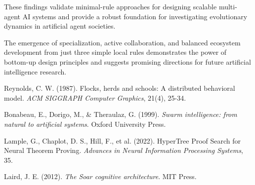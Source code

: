 \documentclass[10pt,twocolumn]{article}
\begin{document}
These findings validate minimal-rule approaches for designing scalable multi-agent AI systems and provide a robust foundation for investigating evolutionary dynamics in artificial agent societies.

The emergence of specialization, active collaboration, and balanced ecosystem development from just three simple local rules demonstrates the power of bottom-up design principles and suggests promising directions for future artificial intelligence research.

\begin{thebibliography}{9}

Reynolds, C. W. (1987). Flocks, herds and schools: A distributed behavioral model. \textit{ACM SIGGRAPH Computer Graphics}, 21(4), 25-34.

Bonabeau, E., Dorigo, M., \& Theraulaz, G. (1999). \textit{Swarm intelligence: from natural to artificial systems}. Oxford University Press.

Lample, G., Chaplot, D. S., Hill, F., et al. (2022). HyperTree Proof Search for Neural Theorem Proving. \textit{Advances in Neural Information Processing Systems}, 35.

Laird, J. E. (2012). \textit{The Soar cognitive architecture}. MIT Press.

\end{thebibliography}
\end{document}
